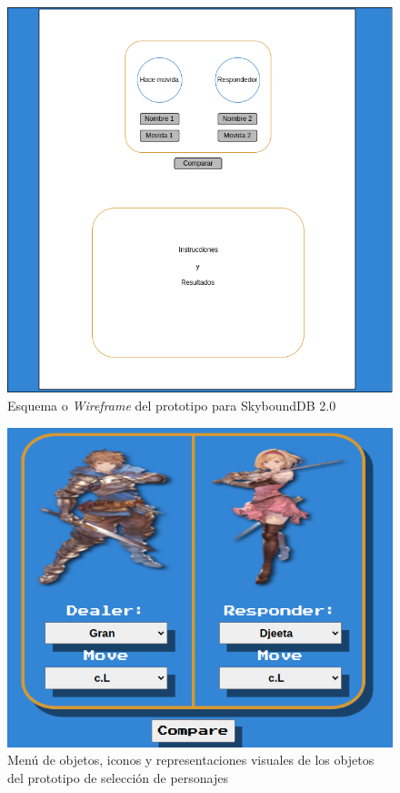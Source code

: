 \begin{center}
    \begin{figure}[ht!]
        \centering
        \includegraphics[height=0.6\textheight]{figures/SkyboundDB2 WireFrame.png}
        \caption{Esquema o \textit{Wireframe} del prototipo para SkyboundDB 2.0}
        \label{fig: wire}
    \end{figure}

    \begin{figure}[ht!]
        \centering
        \includegraphics[height=0.4\textheight]{figures/Character_select_menu-object.png}
        \caption{Menú de objetos, iconos y representaciones visuales de los objetos del prototipo de selección de personajes}
        \label{fig: char sel prt}
    \end{figure}
\end{center}
  
